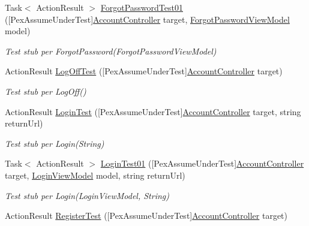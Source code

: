 \begin{DoxyCompactItemize}
Task$<$ Action\+Result $>$ \mbox{\hyperlink{class_brew_day2_1_1_controllers_1_1_testsn_1_1_account_controller_test_a49f31e771b31adc805ecb0cb6978475b}{Forgot\+Password\+Test01}} (\mbox{[}Pex\+Assume\+Under\+Test\mbox{]}\mbox{\hyperlink{class_brew_day2_1_1_controllers_1_1_account_controller}{Account\+Controller}} target, \mbox{\hyperlink{class_brew_day2_1_1_models_1_1_forgot_password_view_model}{Forgot\+Password\+View\+Model}} model)
\begin{DoxyCompactList}\small\item\em Test stub per Forgot\+Password(\+Forgot\+Password\+View\+Model)\end{DoxyCompactList}\item 
Action\+Result \mbox{\hyperlink{class_brew_day2_1_1_controllers_1_1_testsn_1_1_account_controller_test_a3cc68c8fd907b4348ccb230a81536b88}{Log\+Off\+Test}} (\mbox{[}Pex\+Assume\+Under\+Test\mbox{]}\mbox{\hyperlink{class_brew_day2_1_1_controllers_1_1_account_controller}{Account\+Controller}} target)
\begin{DoxyCompactList}\small\item\em Test stub per Log\+Off()\end{DoxyCompactList}\item 
Action\+Result \mbox{\hyperlink{class_brew_day2_1_1_controllers_1_1_testsn_1_1_account_controller_test_a82679cecb570fc7c10e4a8fab11075d2}{Login\+Test}} (\mbox{[}Pex\+Assume\+Under\+Test\mbox{]}\mbox{\hyperlink{class_brew_day2_1_1_controllers_1_1_account_controller}{Account\+Controller}} target, string return\+Url)
\begin{DoxyCompactList}\small\item\em Test stub per Login(\+String)\end{DoxyCompactList}\item 
Task$<$ Action\+Result $>$ \mbox{\hyperlink{class_brew_day2_1_1_controllers_1_1_testsn_1_1_account_controller_test_a0ed64cc692873c950ddc7d4667ec24ce}{Login\+Test01}} (\mbox{[}Pex\+Assume\+Under\+Test\mbox{]}\mbox{\hyperlink{class_brew_day2_1_1_controllers_1_1_account_controller}{Account\+Controller}} target, \mbox{\hyperlink{class_brew_day2_1_1_models_1_1_login_view_model}{Login\+View\+Model}} model, string return\+Url)
\begin{DoxyCompactList}\small\item\em Test stub per Login(\+Login\+View\+Model, String)\end{DoxyCompactList}\item 
Action\+Result \mbox{\hyperlink{class_brew_day2_1_1_controllers_1_1_testsn_1_1_account_controller_test_a5c80c26eb236dbb632ee2c9a3433051c}{Register\+Test}} (\mbox{[}Pex\+Assume\+Under\+Test\mbox{]}\mbox{\hyperlink{class_brew_day2_1_1_controllers_1_1_account_controller}{Account\+Controller}} target)

\end{DoxyCompactItemize}
